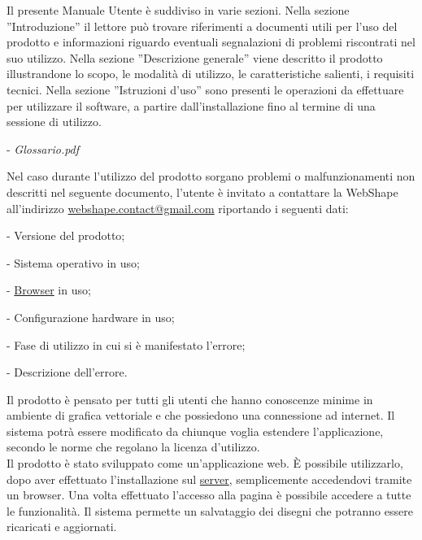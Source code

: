 Il presente Manuale Utente \`e suddiviso in varie sezioni. Nella sezione ''Introduzione'' il lettore pu\`o trovare riferimenti a documenti utili per l'uso del prodotto e informazioni riguardo eventuali segnalazioni di problemi riscontrati nel suo utilizzo.
Nella sezione ''Descrizione generale'' viene descritto il prodotto illustrandone lo scopo, le modalit\`a di utilizzo, le caratteristiche salienti, i requisiti tecnici. Nella sezione ''Istruzioni d'uso'' sono presenti le operazioni da effettuare per utilizzare il software, a partire dall'installazione fino al termine di una sessione di utilizzo.\\ %
 
 
\begin{elencopuntato}[\normindent]
  \item[-] \textit{Glossario.pdf}
\end{elencopuntato}
 
Nel caso durante l'utilizzo del prodotto sorgano problemi o malfunzionamenti non descritti nel seguente documento, l'utente \`e invitato a contattare la WebShape all'indirizzo \href{mailto:webshape.contact@gmail.com}{webshape.contact@gmail.com} riportando i seguenti dati:\\
\begin{elencopuntato}[\normindent]
  \item[-] Versione del prodotto;
  \item[-] Sistema operativo in uso;
  \item[-] \underline{Browser} in uso;
  \item[-] Configurazione hardware in uso;
  \item[-] Fase di utilizzo in cui si \`e manifestato l'errore;
  \item[-] Descrizione dell'errore.
\end{elencopuntato}
 

Il prodotto \`e pensato per tutti gli utenti che hanno conoscenze minime in ambiente di grafica vettoriale e che possiedono una connessione ad internet. Il sistema potr\`a essere modificato da chiunque voglia estendere l'applicazione, secondo le norme che regolano la licenza d'utilizzo.\\
 
Il prodotto \`e stato sviluppato come un'applicazione web. \`E possibile utilizzarlo, dopo aver effettuato l'installazione sul \underline{server}, semplicemente accedendovi tramite un browser. Una volta effettuato l'accesso alla pagina \`e possibile accedere a tutte le funzionalit\`a. Il sistema permette un salvataggio dei disegni che potranno essere ricaricati e aggiornati.
 
